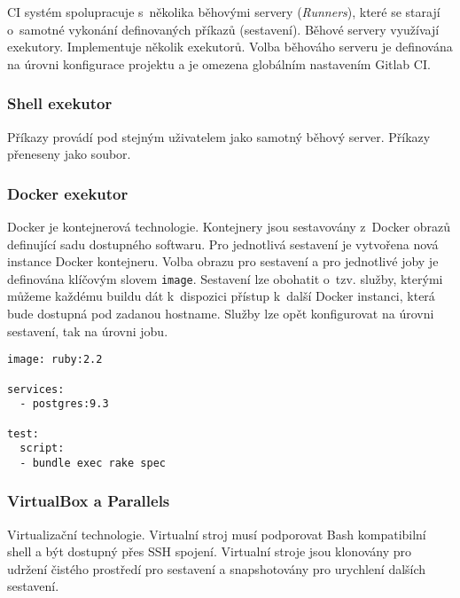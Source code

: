 CI systém spolupracuje s~několika běhovými servery (\textit{Runners}), které se starají o~samotné vykonání definovaných příkazů (sestavení).
Běhové servery využívají exekutory.
Implementuje několik exekutorů.
Volba běhováho serveru je definována na úrovni konfigurace projektu a je omezena globálním nastavením Gitlab CI.


\subsubsection{Shell exekutor}

Příkazy provádí pod stejným uživatelem jako samotný běhový server.
Příkazy přeneseny jako soubor.

\subsubsection{Docker exekutor}

Docker je kontejnerová technologie.
Kontejnery jsou sestavovány z~Docker obrazů definující sadu dostupného softwaru.
Pro jednotlivá sestavení je vytvořena nová instance Docker kontejneru.
Volba obrazu pro sestavení a pro jednotlivé joby je definována klíčovým slovem \verb|image|.
Sestavení lze obohatit o~tzv. služby, kterými můžeme každému buildu dát k~dispozici přístup k~další Docker instanci, která bude dostupná pod zadanou hostname.
Služby lze opět konfigurovat na úrovni sestavení, tak na úrovni jobu.

\begin{verbatim}
image: ruby:2.2

services:
  - postgres:9.3

test:
  script:
  - bundle exec rake spec
\end{verbatim}

\subsubsection{VirtualBox a Parallels}

Virtualizační technologie.
Virtualní stroj musí podporovat Bash kompatibilní shell a být dostupný přes SSH spojení.
Virtualní stroje jsou klonovány pro udržení čistého prostředí pro sestavení a snapshotovány pro urychlení dalších sestavení.


